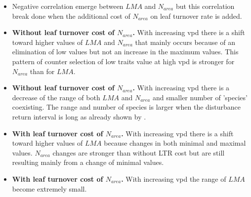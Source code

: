 \documentclass[a4paper,11pt]{article}
\begin{document}
\begin{itemize}

\item Negative correlation emerge between $LMA$ and $N_{area}$ but this correlation break done when the additional cost of $N_{area}$ on leaf turnover rate is added.

\item \textbf{Without leaf turnover cost of $N_{area}$.} With increasing vpd there is a shift toward higher values of $LMA$ and $N_{area}$ that mainly occurs because of an elimination of low values but not an increase in the maximum values. This pattern of counter selection of low traits value at high vpd is stronger for $N_{area}$ than for $LMA$.

\item \textbf{Without leaf turnover cost of $N_{area}$.} With increasing vpd there is a decrease of the range of both $LMA$ and $N_{area}$ and smaller number of 'species' coexisting. The range and number of species is larger when the disturbance return interval is long as already shown by \citet{Falster-2017}.

\item \textbf{With leaf turnover cost of $N_{area}$.} With increasing vpd there is a shift toward higher values of $LMA$ because changes in both minimal and maximal values. $N_{area}$ changes are stronger than without LTR cost but are still resulting mainly from a change of minimal values.

\item \textbf{With leaf turnover cost of $N_{area}$.} With increasing vpd the range of $LMA$ become extremely small.

\end{itemize}






\end{document}
